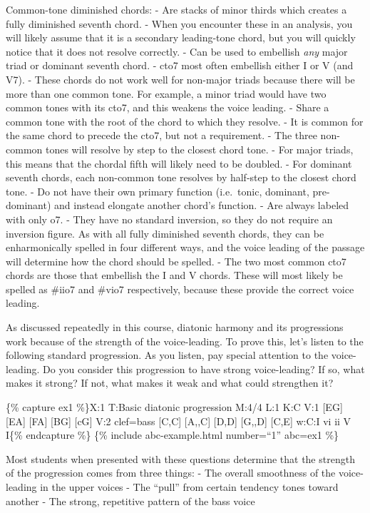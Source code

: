 \documentclass{book}
\begin{document}
Common-tone diminished chords: - Are stacks of minor thirds which creates a
fully diminished seventh chord. - When you encounter these in an analysis, you
will likely assume that it is a secondary leading-tone chord, but you will
quickly notice that it does not resolve correctly. - Can be used to embellish
\emph{any} major triad or dominant seventh chord. - cto7 most often embellish
either I or V (and V7). - These chords do not work well for non-major triads
because there will be more than one common tone. For example, a minor triad
would have two common tones with its cto7, and this weakens the voice leading.
- Share a common tone with the root of the chord to which they resolve. - It
is common for the same chord to precede the cto7, but not a requirement. - The
three non-common tones will resolve by step to the closest chord tone. - For
major triads, this means that the chordal fifth will likely need to be
doubled. - For dominant seventh chords, each non-common tone resolves by
half-step to the closest chord tone. - Do not have their own primary function
(i.e.~tonic, dominant, pre-dominant) and instead elongate another chord's
function. - Are always labeled with only o7. - They have no standard
inversion, so they do not require an inversion figure. As with all fully
diminished seventh chords, they can be enharmonically spelled in four
different ways, and the voice leading of the passage will determine how the
chord should be spelled. - The two most common cto7 chords are those that
embellish the I and V chords. These will most likely be spelled as \#iio7 and
\#vio7 respectively, because these provide the correct voice leading.

As discussed repeatedly in this course, diatonic harmony and its progressions
work because of the strength of the voice-leading. To prove this, let's listen
to the following standard progression. As you listen, pay special attention to
the voice-leading. Do you consider this progression to have strong
voice-leading? If so, what makes it strong? If not, what makes it weak and
what could strengthen it?

\{\% capture ex1 \%\}X:1 T:Basic diatonic progression M:4/4 L:1 K:C V:1
{[}EG{]}\textbar{} {[}EA{]}\textbar{} {[}FA{]}\textbar{} {[}BG{]}\textbar{}
{[}cG{]}\textbar{]} V:2 clef=bass {[}C,C{]}\textbar{} {[}A,,C{]}\textbar{}
{[}D,D{]}\textbar{} {[}G,,D{]}\textbar{} {[}C,E{]}\textbar{]} w:C:I vi ii V
I\{\% endcapture \%\} \{\% include abc-example.html number=``1'' abc=ex1 \%\}

Most students when presented with these questions determine that the strength
of the progression comes from three things: - The overall smoothness of the
voice-leading in the upper voices - The ``pull'' from certain tendency tones
toward another - The strong, repetitive pattern of the bass voice
\end{document}
